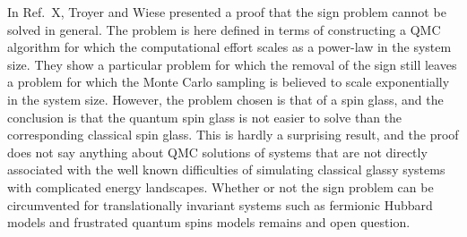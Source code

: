 \documentclass[range]{ar2e}
\begin{document}
In Ref.~X, Troyer and Wiese presented a proof that the sign problem cannot be solved in general. The problem is here
defined in terms of constructing a QMC algorithm for which the computational effort scales as a power-law in the system
size. They show a particular problem for which the removal of the sign still leaves a problem for which the Monte Carlo
sampling is believed to scale exponentially in the system size. However, the problem chosen is that of a spin glass, and 
the conclusion is that the quantum spin glass is not easier to solve than the corresponding classical spin glass. This is 
hardly a surprising result, and the proof does not say anything about QMC solutions of systems that are not directly
associated with the well known difficulties of simulating classical glassy systems with complicated energy landscapes. 
Whether or not the sign problem can be circumvented for translationally invariant systems such as fermionic Hubbard models 
and frustrated quantum spins models remains and open question.




\end{document}
